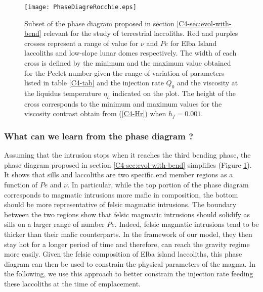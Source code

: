 \begin{figure}[h!]
  \begin{center}
    \graphicspath{ {/Users/thorey/Documents/These/Projet/Refroidissement/Skin_Model/Figure/Figure_Heating/} }
    \texttt{[image: PhaseDiagreRocchie.eps]}
    \caption{Subset  of   the  phase   diagram  proposed   in  section
      \ref{C4-sec:evol-with-bend}   relevant   for    the   study   of
      terrestrial  laccoliths. Red  and  purples  crosses represent  a
      range of value for $\nu$ and $Pe$ for Elba Island laccoliths and
      low-slope lunar domes  respectively. The width of  each cross is
      defined by  the minimum and  the maximum value obtained  for the
      Peclet number given the range  of variation of parameters listed
      in  table \ref{C4-tab}  and  the injection  rate  $Q_0$ and  the
      viscosity at the liquidus  temperature $\eta_h$ indicated on the
      plot. The  height of  the cross corresponds  to the  minimum and
      maximum   values  for   the  viscosity   contrast  obtain   from
      (\ref{C4-Hr}) when $h_f=0.001$.}
    \label{C4-PhaseDiag}
  \end{center}
\end{figure}

\subsubsection*{What can we learn from the phase diagram ?}

Assuming that  the intrusion stops  when it reaches the  third bending
phase,     the      phase     diagram     proposed      in     section
\ref{C4-sec:evol-with-bend}  simplifies  (Figure  \ref{C4-PhaseDiag}).
It shows that sills and laccoliths are two specific end member regions
as a function of $Pe$ and  $\nu$. In particular, while the top portion
of the phase diagram corresponds  to magmatic intrusions more mafic in
composition,  the  bottom  should  be more  representative  of  felsic
magmatic intrusions.  The  boundary between the two  regions show that
felsic magmatic intrusions should solidify  as sills on a larger range
of number $Pe$. Indeed, felsic  magmatic intrusions tend to be thicker
than their  mafic counterparts.  In  the framework of our  model, they
then stay hot for a longer period of time and therefore, can reach the
gravity  regime more  easily.  Given  the felsic  composition of  Elba
island laccoliths,  this phase diagram  can then be used  to constrain
the physical parameters  of the magma.  In the following,  we use this
approach  to  better  constrain   the  injection  rate  feeding  these
laccoliths at the time of emplacement.

